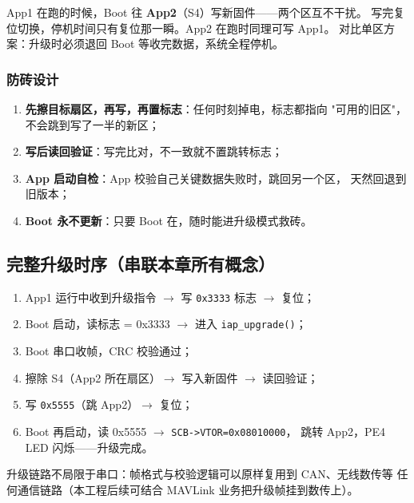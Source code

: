 App1 在跑的时候，Boot 往 \textbf{App2}（S4）写新固件——两个区互不干扰。
写完复位切换，停机时间只有复位那一瞬。App2 在跑时同理可写 App1。
对比单区方案：升级时必须退回 Boot 等收完数据，系统全程停机。

\subsubsection{防砖设计}

\begin{enumerate}
  \item \textbf{先擦目标扇区，再写，再置标志}：任何时刻掉电，标志都指向
        "可用的旧区"，不会跳到写了一半的新区；
  \item \textbf{写后读回验证}：写完比对，不一致就不置跳转标志；
  \item \textbf{App 启动自检}：App 校验自己关键数据失败时，跳回另一个区，
        天然回退到旧版本；
  \item \textbf{Boot 永不更新}：只要 Boot 在，随时能进升级模式救砖。
\end{enumerate}

\subsection{完整升级时序（串联本章所有概念）}

\begin{enumerate}
  \item App1 运行中收到升级指令 $\to$ 写 \texttt{0x3333} 标志 $\to$ 复位；
  \item Boot 启动，读标志 = 0x3333 $\to$ 进入 \texttt{iap\_upgrade()}；
  \item Boot 串口收帧，CRC 校验通过；
  \item 擦除 S4（App2 所在扇区）$\to$ 写入新固件 $\to$ 读回验证；
  \item 写 \texttt{0x5555}（跳 App2）$\to$ 复位；
  \item Boot 再启动，读 0x5555 $\to$ \texttt{SCB->VTOR=0x08010000}，
        跳转 App2，PE4 LED 闪烁——升级完成。
\end{enumerate}

升级链路不局限于串口：帧格式与校验逻辑可以原样复用到 CAN、无线数传等
任何通信链路（本工程后续可结合 MAVLink 业务把升级帧挂到数传上）。
